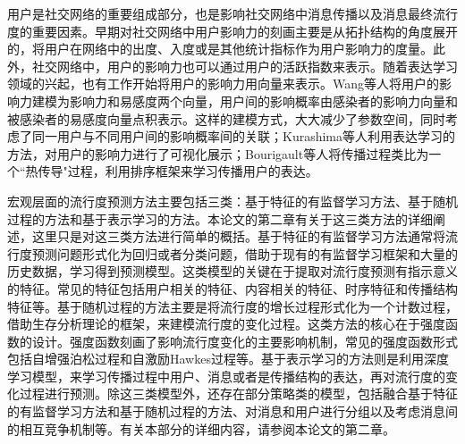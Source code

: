 用户是社交网络的重要组成部分，也是影响社交网络中消息传播以及消息最终流行度的重要因素。早期对社交网络中用户影响力的刻画主要是从拓扑结构的角度展开的，将用户在网络中的出度、入度或是其他统计指标作为用户影响力的度量\citep{brown2011measuring,liang2012analyzing}。此外，社交网络中，用户的影响力也可以通过用户的活跃指数来表示\citep{li2013novel,cha2010measuring}。随着表达学习领域的兴起，也有工作开始将用户的影响力用向量来表示。Wang等人\citep{wang2015learning}将用户的影响力建模为影响力和易感度两个向量，用户间的影响概率由感染者的影响力向量和被感染者的易感度向量点积表示。这样的建模方式，大大减少了参数空间，同时考虑了同一用户与不同用户间的影响概率间的关联；Kurashima等人\citep{kurashima2014probabilistic}利用表达学习的方法，对用户的影响力进行了可视化展示；Bourigault等人\citep{bourigault2014learning}将传播过程类比为一个``热传导"过程，利用排序框架来学习传播用户的表达。

宏观层面的流行度预测方法主要包括三类：基于特征的有监督学习方法、基于随机过程的方法和基于表示学习的方法。本论文的第二章有关于这三类方法的详细阐述，这里只是对这三类方法进行简单的概括。基于特征的有监督学习方法通常将流行度预测问题形式化为回归或者分类问题，借助于现有的有监督学习框架和大量的历史数据，学习得到预测模型。这类模型的关键在于提取对流行度预测有指示意义的特征。常见的特征包括用户相关的特征、内容相关的特征、时序特征和传播结构特征等。基于随机过程的方法主要是将流行度的增长过程形式化为一个计数过程\citep{andersen1985counting}，借助生存分析理论\citep{klein2005survival}的框架，来建模流行度的变化过程。这类方法的核心在于强度函数的设计。强度函数刻画了影响流行度变化的主要影响机制，常见的强度函数形式包括自增强泊松过程\citep{pemantle2007survey}和自激励Hawkes过程\citep{hawkes1974cluster}等。基于表示学习的方法则是利用深度学习模型，来学习传播过程中用户、消息或者是传播结构的表达，再对流行度的变化过程进行预测。除这三类模型外，还存在部分策略类的模型，包括融合基于特征的有监督学习方法和基于随机过程的方法、对消息和用户进行分组以及考虑消息间的相互竞争机制等。有关本部分的详细内容，请参阅本论文的第二章。

